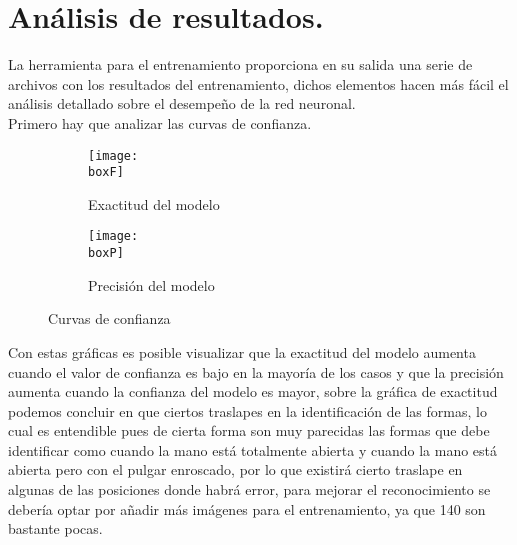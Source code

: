 \documentclass[a4paper, 12pt]{article}
\newcommand{\boxF}{img/BoxF1_curve.png}
\newcommand{\boxP}{img/BoxP_curve.png}
\begin{document}
    \clearpage 

    \section{Análisis de resultados.} 
    La herramienta para el entrenamiento proporciona en su salida una serie de archivos con los resultados del entrenamiento, dichos elementos hacen más fácil el análisis detallado sobre el desempeño de la red neuronal.\\ 
    Primero hay que analizar las curvas de confianza. 

    \begin{figure}[H] 
        \centering 

        \begin{subfigure}{0.75\linewidth} 
            \texttt{[image: \\boxF]} 
            \label{F1_curve} 
            \caption{Exactitud del modelo} 
        \end{subfigure} 

        \begin{subfigure}{0.75\linewidth} 
            \texttt{[image: \\boxP]} 
            \label{P_curve} 
            \caption{Precisión del modelo} 
        \end{subfigure} 

        \caption{Curvas de confianza} 
    \end{figure} 

    Con estas gráficas es posible visualizar que la exactitud del modelo aumenta cuando el valor de confianza es bajo en la mayoría de los casos y que la precisión aumenta cuando la confianza del modelo es mayor, sobre la gráfica de exactitud podemos concluir en que ciertos traslapes en la identificación de las formas, lo cual es entendible pues de cierta forma son muy parecidas las formas que debe identificar como cuando la mano está totalmente abierta y cuando la mano está abierta pero con el pulgar enroscado, por lo que existirá cierto traslape en algunas de las posiciones donde habrá error, para mejorar el reconocimiento se debería optar por añadir más imágenes para el entrenamiento, ya que 140 son bastante pocas. 
\end{document}
